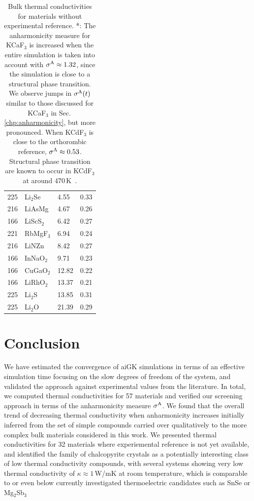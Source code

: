 \begin{table}[ht]
\begin{tabularx}{\linewidth}{rXXX}
         225 &   Li$_2$Se &             4.55 &       0.33 \\
         216 &     LiAsMg &             4.67 &       0.26 \\
         166 &  LiScS$_2$ &             6.42 &       0.27 \\
         221 &  RbMgF$_3$ &             6.94 &       0.24 \\
         216 &      LiNZn &             8.42 &       0.27 \\
         166 &  InNaO$_2$ &             9.71 &       0.23 \\
         166 &  CuGaO$_2$ &            12.82 &       0.22 \\
         166 &  LiRhO$_2$ &            13.37 &       0.21 \\
         225 &    Li$_2$S &            13.85 &       0.31 \\
         225 &    Li$_2$O &            21.39 &       0.29 \\
\bottomrule
\end{tabularx}
  \caption{Bulk thermal conductivities for materials without experimental reference. *: The anharmonicity measure for KCaF$_3$ is increased when the entire simulation is taken into account with $\sigma^\mathrm{A} \approx 1.32$, since the simulation is close to a structural phase transition. We observe jumps in $\sigma^\mathrm{A} (t)$ similar to those discussed for KCaF$_3$ in Sec.\,\ref{chp:anharmonicity}, but more pronounced. When KCdF$_3$ is close to the orthorombic reference, $\sigma^\mathrm{A} \approx 0.53$. Structural phase transition are known to occur in KCdF$_3$ at around 470\,K~\cite{hidaka1977,hidaka1990}.}
  \label{tab:kappa.noexp}
\end{table}

\section{Conclusion}
We have estimated the convergence of aiGK simulations in terms of an effective simulation time focusing on the slow degrees of freedom of the system, and validated the approach against experimental values from the literature. In total, we computed thermal conductivities for  57 materials and verified our screening approach in terms of the anharmonicity measure $\sigma^\mathrm{A}$. We found that the overall trend of decreasing thermal conductivity when anharmonicity increases initially inferred from the set of simple compounds carried over qualitatively to the more complex bulk materials considered in this work. We presented thermal conductivities for  32 materials where experiemental reference is not yet available, and identified the family of chalcopyrite crystals as a potentially interesting class of low thermal conductivity compounds, with several systems showing very low thermal conductivity of $\kappa \approx 1$\,W/mK at room temperature, which is comparable to or even below currently investigated thermoelectric candidates such as SnSe or Mg$_2$Sb$_3$~\cite{zhao2014,wei2016,sassi2014,pan2020,kajikawa2003,condron2006,zhang2009,zhang2018,ding2021}
